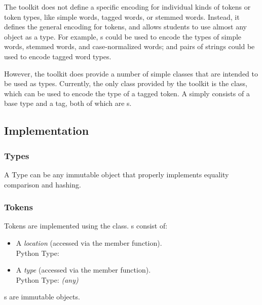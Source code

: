 \documentclass[11pt]{article}
\begin{document}
  The toolkit does not define a specific encoding for individual kinds
  of tokens or token types, like simple words, tagged words, or
  stemmed words.  Instead, it defines the general encoding for tokens,
  and allows students to use almost any object as a type.  For
  example, s could be used to encode the types of simple
  words, stemmed words, and case-normalized words; and pairs of
  strings could be used to encode tagged word types.

  However, the toolkit does provide a number of simple classes that
  are intended to be used as types.  Currently, the only class
  provided by the toolkit is the  class, which can be
  used to encode the type of a tagged token.  A 
  simply consists of a base type and a tag, both of which are
  s.

  \subsection{Implementation}

  \subsubsection{Types}
      A Type can be any immutable object that properly implements
      equality comparison and hashing.

  \subsubsection{Tokens}
      Tokens are implemented using the  class.
      s consist of:
  
      \begin{itemize}
    
        \item A \emph{location} (accessed via the  member
        function).  \\
        Python Type: 
    
        \item A \emph{type} (accessed via the  member
        function).  \\
        Python Type: \emph{(any)}
    
      \end{itemize}
      
      \noindent
      s are immutable objects.
\end{document}
